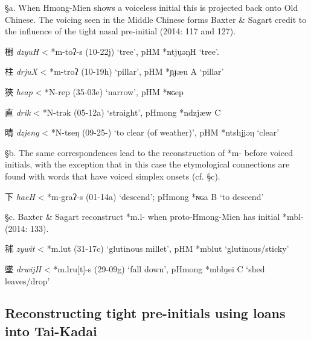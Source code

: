 §a. When Hmong-Mien shows a voiceless initial this is projected back
onto Old Chinese. The voicing seen in the Middle Chinese forms Baxter \&
Sagart credit to the influence of the tight nasal pre-initial (2014: 117
and 127).

\begin{description} \item
樹 \emph{dzyuH} \textless{} *m-toʔ-s (10-22j) `tree', pHM *ntju̯əŋH
`tree'.

\item
柱 \emph{drjuX} \textless{} *m-troʔ (10-19h) `pillar', pHM *ɲɟæu A
`pillar'

\item
狹 \emph{heap} \textless{} *N-{}rep (35-03e) `narrow', pHM *ɴɢep

\item
直 \emph{drik} \textless{} *N-trək (05-12a) `straight', pHmong *ndzjæw C

\item
晴 \emph{dzjeng} \textless{} *N-ts{}eŋ (09-25-) `to clear (of weather)',
pHM *ntshji̯əŋ `clear'
\end{description}

§b. The same correspondences lead to the reconstruction of *m- before
voiced initials, with the exception that in this case the etymological
connections are found with words that have voiced simplex onsets (cf.
§c).

\begin{description} \item
下 \emph{haeH} \textless{} *m-g{}raʔ-s (01-14a) `descend'; pHmong *ɴɢa B
`to descend'
\end{description}

§c. Baxter \& Sagart reconstruct *m.l- when proto-Hmong-Mien has initial
*mbl- (2014: 133).

\begin{description} 
\item
秫 \emph{zywit} \textless{} *m.lut (31-17c) `glutinous millet', pHM
*mblut `glutinous/sticky'

\item
墜 \emph{drwijH} \textless{} *m.lru{[}t]-s (29-09g) `fall down',
pHmong *mblu̯ei C `shed leaves/drop'
\end{description}

\subsection{Reconstructing tight pre-initials using loans into
Tai-Kadai}\label{reconstructing-tight-pre-initials-using-loans-into-tai-kadai}

